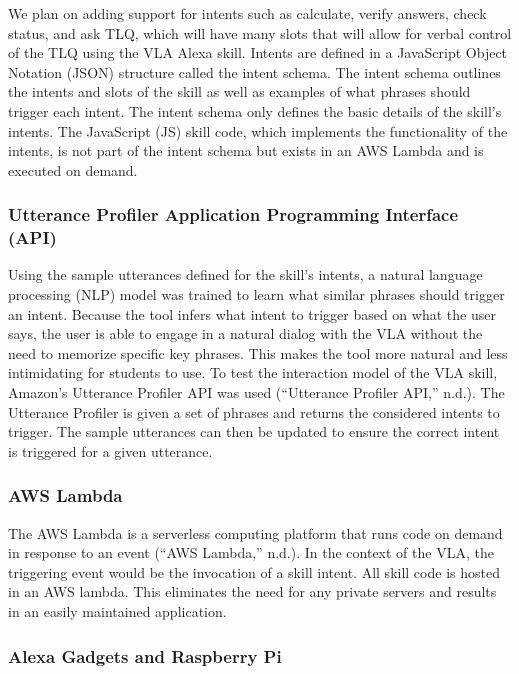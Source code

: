 \documentclass[11.5pt]{sig-alternate} %
\begin{document}
\begin{large}
We plan on adding support for intents such as calculate, verify answers, check status, and ask TLQ, which will have many slots that will allow for verbal control of the TLQ using the VLA Alexa skill. 
Intents are defined in a JavaScript Object Notation (JSON) structure called the intent schema. The intent schema outlines the intents and slots of the skill as well as examples of what phrases should trigger each intent. The intent schema only defines the basic details of the skill’s intents. The JavaScript (JS) skill code, which implements the functionality of the intents, is not part of the intent schema but exists in an AWS Lambda and is executed on demand.

\subsubsection*{Utterance Profiler Application Programming Interface (API)}

Using the sample utterances defined for the skill’s intents, a natural language processing (NLP) model was trained to learn what similar phrases should trigger an intent. Because the tool infers what intent to trigger based on what the user says, the user is able to engage in a natural dialog with the VLA without the need to memorize specific key phrases. This makes the tool more natural and less intimidating for students to use. To test the interaction model of the VLA skill, Amazon’s Utterance Profiler API was used (“Utterance Profiler API,” n.d.). The Utterance Profiler is given a set of phrases and returns the considered intents to trigger. The sample utterances can then be updated to ensure the correct intent is triggered for a given utterance.
\newpage
\subsubsection*{AWS Lambda}

The AWS Lambda is a serverless computing platform that runs code on demand in response to an event (“AWS Lambda,” n.d.). In the context of the VLA, the triggering event would be the invocation of a skill intent. All skill code is hosted in an AWS lambda. This eliminates the need for any private servers and results in an easily maintained application. 

\subsubsection*{Alexa Gadgets and Raspberry Pi}


\end{large}
\end{document}
